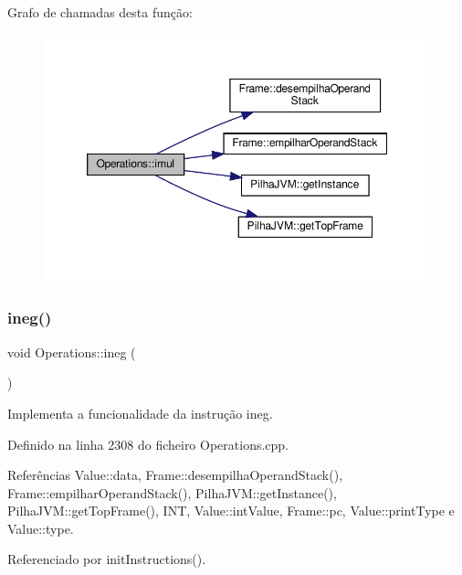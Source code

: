 Grafo de chamadas desta função\+:
\nopagebreak
\begin{figure}[H]
\begin{center}
\leavevmode
\includegraphics[width=350pt]{classOperations_a01b2ffdd380327b31b03657eb99b8a81_cgraph}
\end{center}
\end{figure}
\mbox{\label{classOperations_a819d5dd66c64a6801a1599b5abf81ae7}} 
\subsubsection{\texorpdfstring{ineg()}{ineg()}}
{\footnotesize\ttfamily void Operations\+::ineg (\begin{DoxyParamCaption}{ }\end{DoxyParamCaption})\hspace{0.3cm}{\ttfamily [private]}}



Implementa a funcionalidade da instrução ineg. 



Definido na linha 2308 do ficheiro Operations.\+cpp.



Referências Value\+::data, Frame\+::desempilha\+Operand\+Stack(), Frame\+::empilhar\+Operand\+Stack(), Pilha\+J\+V\+M\+::get\+Instance(), Pilha\+J\+V\+M\+::get\+Top\+Frame(), I\+NT, Value\+::int\+Value, Frame\+::pc, Value\+::print\+Type e Value\+::type.



Referenciado por init\+Instructions().


